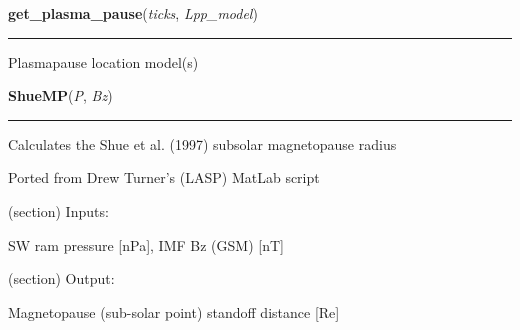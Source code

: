    \label{spacepy:empiricals:get_plasma_pause}

    \vspace{0.5ex}

\hspace{.8\funcindent}\begin{boxedminipage}{\funcwidth}

    \raggedright \textbf{get\_plasma\_pause}(\textit{ticks}, \textit{Lpp\_model})

    \vspace{-1.5ex}

    \rule{\textwidth}{0.5\fboxrule}
\setlength{\parskip}{2ex}
    Plasmapause location model(s)

\setlength{\parskip}{1ex}
    \end{boxedminipage}

    \label{spacepy:empiricals:ShueMP}

    \vspace{0.5ex}

\hspace{.8\funcindent}\begin{boxedminipage}{\funcwidth}

    \raggedright \textbf{ShueMP}(\textit{P}, \textit{Bz})

    \vspace{-1.5ex}

    \rule{\textwidth}{0.5\fboxrule}
\setlength{\parskip}{2ex}
    Calculates the Shue et al. (1997) subsolar magnetopause radius

    Ported from Drew Turner's (LASP) MatLab script

    (section) Inputs:

      SW ram pressure [nPa], IMF Bz (GSM) [nT]

    (section) Output:

      Magnetopause (sub-solar point) standoff distance [Re]

\setlength{\parskip}{1ex}
    \end{boxedminipage}



